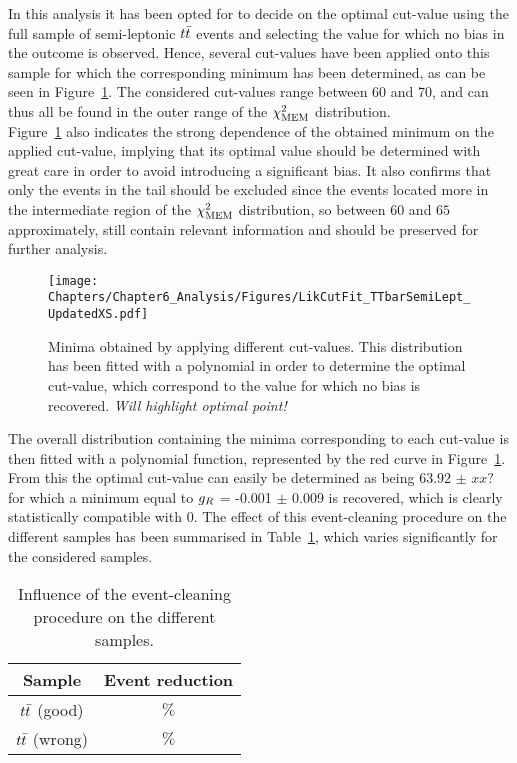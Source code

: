 In this analysis it has been opted for to decide on the optimal cut-value using the full sample of semi-leptonic $t\bar{t}$ events and selecting the value for which no bias in the outcome is observed.
Hence, several cut-values have been applied onto this sample for which the corresponding minimum has been determined, as can be seen in Figure~\ref{fig::CutValueFit}.
The considered cut-values range between 60 and 70, and can thus all be found in the outer range of the $\chi^{2}_{\textrm{MEM}}$ distribution.
\\
Figure~\ref{fig::CutValueFit} also indicates the strong dependence of the obtained minimum on the applied cut-value, implying that its optimal value should be determined with great care in order to avoid introducing a significant bias. It also confirms that only the events in the tail should be excluded since the events located more in the intermediate region of the $\chi^{2}_{\textrm{MEM}}$ distribution, so between $60$ and $65$ approximately, still contain relevant information and should be preserved for further analysis.
\\
\begin{figure}[h!t]
 \centering
 \texttt{[image: Chapters/Chapter6\_Analysis/Figures/LikCutFit\_TTbarSemiLept\_UpdatedXS.pdf]}
 \caption{Minima obtained by applying different cut-values. This distribution has been fitted with a polynomial in order to determine the optimal cut-value, which correspond to the value for which no bias is recovered. \textit{Will highlight optimal point!}} \label{fig::CutValueFit}
\end{figure}

The overall distribution containing the minima corresponding to each cut-value is then fitted with a polynomial function, represented by the red curve in Figure~\ref{fig::CutValueFit}.
From this the optimal cut-value can easily be determined as being $63.92$ $\pm$ $xx?$ for which a minimum equal to $g_{R}$ = -0.001 $\pm$ 0.009 is recovered, which is clearly statistically compatible with 0.
The effect of this event-cleaning procedure on the different samples has been summarised in Table~\ref{table::CutInfl}, which varies significantly for the considered samples.
\\
\begin{table}[h!t]
 \centering
 \caption{Influence of the event-cleaning procedure on the different samples.} \label{table::CutInfl}
 \renewcommand{\arraystretch}{1.2}
 \begin{tabular}{c|c}
  Sample 		& Event reduction 	\\
  \hline
  $t\bar{t}$ (good)	& $\%$ 			\\
  $t\bar{t}$ (wrong) 	& $\%$ 			\\
 \end{tabular}
\end{table}

